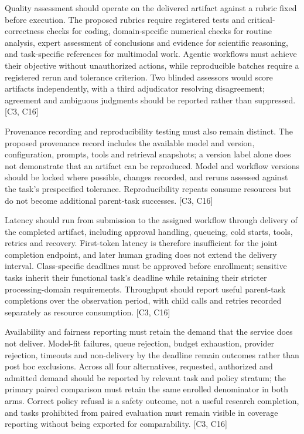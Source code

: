 \documentclass[11pt]{article}
\begin{document}
Quality assessment should operate on the delivered artifact against a rubric fixed before execution. The proposed rubrics require registered tests and critical-correctness checks for coding, domain-specific numerical checks for routine analysis, expert assessment of conclusions and evidence for scientific reasoning, and task-specific references for multimodal work. Agentic workflows must achieve their objective without unauthorized actions, while reproducible batches require a registered rerun and tolerance criterion. Two blinded assessors would score artifacts independently, with a third adjudicator resolving disagreement; agreement and ambiguous judgments should be reported rather than suppressed. [C3, C16]

Provenance recording and reproducibility testing must also remain distinct. The proposed provenance record includes the available model and version, configuration, prompts, tools and retrieval snapshots; a version label alone does not demonstrate that an artifact can be reproduced. Model and workflow versions should be locked where possible, changes recorded, and reruns assessed against the task\textquoteright{}s prespecified tolerance. Reproducibility repeats consume resources but do not become additional parent-task successes. [C3, C16]

Latency should run from submission to the assigned workflow through delivery of the completed artifact, including approval handling, queueing, cold starts, tools, retries and recovery. First-token latency is therefore insufficient for the joint completion endpoint, and later human grading does not extend the delivery interval. Class-specific deadlines must be approved before enrollment; sensitive tasks inherit their functional task\textquoteright{}s deadline while retaining their stricter processing-domain requirements. Throughput should report useful parent-task completions over the observation period, with child calls and retries recorded separately as resource consumption. [C3, C16]

Availability and fairness reporting must retain the demand that the service does not deliver. Model-fit failures, queue rejection, budget exhaustion, provider rejection, timeouts and non-delivery by the deadline remain outcomes rather than post hoc exclusions. Across all four alternatives, requested, authorized and admitted demand should be reported by relevant task and policy stratum; the primary paired comparison must retain the same enrolled denominator in both arms. Correct policy refusal is a safety outcome, not a useful research completion, and tasks prohibited from paired evaluation must remain visible in coverage reporting without being exported for comparability. [C3, C16]
\end{document}
